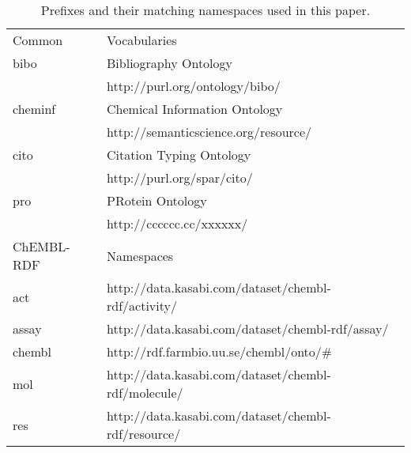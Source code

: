 \documentclass[sw]{iosart2c}
\begin{document}
\begin{table*}
\caption{Prefixes and their matching namespaces used in this paper.} \label{namespaces}
\begin{tabular}{ll}
\hline
Common & Vocabularies \\
bibo    & Bibliography Ontology~\cite{Giasson2011} \\
        & http://purl.org/ontology/bibo/ \\
cheminf & Chemical Information Ontology~\cite{Hastings2011} \\
        & http://semanticscience.org/resource/ \\
cito    & Citation Typing Ontology~\cite{Shotton2010} \\
        & http://purl.org/spar/cito/ \\
pro     & PRotein Ontology~\cite{XXX} \\
        & http://cccccc.cc/xxxxxx/ \\

\hline
ChEMBL-RDF & Namespaces\\
act    & http://data.kasabi.com/dataset/chembl-rdf/activity/ \\
assay  & http://data.kasabi.com/dataset/chembl-rdf/assay/ \\
chembl & http://rdf.farmbio.uu.se/chembl/onto/\# \\
mol    & http://data.kasabi.com/dataset/chembl-rdf/molecule/ \\
res    & http://data.kasabi.com/dataset/chembl-rdf/resource/ \\
\hline
\end{tabular}
\end{table*}



%
%
%
\end{document}
